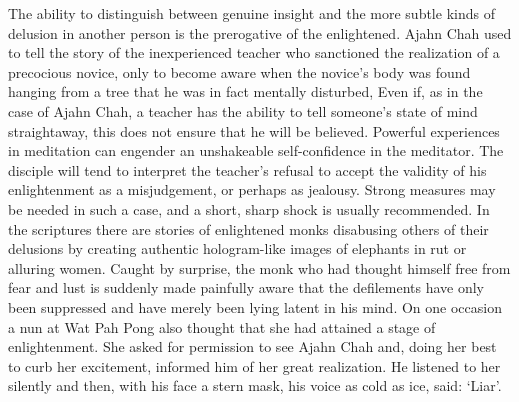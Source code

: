 The ability to distinguish between genuine insight and the more subtle
kinds of delusion in another person is the prerogative of the
enlightened. Ajahn Chah used to tell the story of the inexperienced
teacher who sanctioned the realization of a precocious novice, only to
become aware when the novice's body was found hanging from a tree that
he was in fact mentally disturbed, Even if, as in the case of Ajahn
Chah, a teacher has the ability to tell someone's state of mind
straightaway, this does not ensure that he will be believed. Powerful
experiences in meditation can engender an unshakeable self-confidence in
the meditator. The disciple will tend to interpret the teacher's refusal
to accept the validity of his enlightenment as a misjudgement, or
perhaps as jealousy. Strong measures may be needed in such a case, and a
short, sharp shock is usually recommended. In the scriptures there are
stories of enlightened monks disabusing others of their delusions by
creating authentic hologram-like images of elephants in rut or alluring
women. Caught by surprise, the monk who had thought himself free from
fear and lust is suddenly made painfully aware that the defilements have
only been suppressed and have merely been lying latent in his mind. On
one occasion a nun at Wat Pah Pong also thought that she had attained a
stage of enlightenment. She asked for permission to see Ajahn Chah and,
doing her best to curb her excitement, informed him of her great
realization. He listened to her silently and then, with his face a stern
mask, his voice as cold as ice, said: `Liar'.
